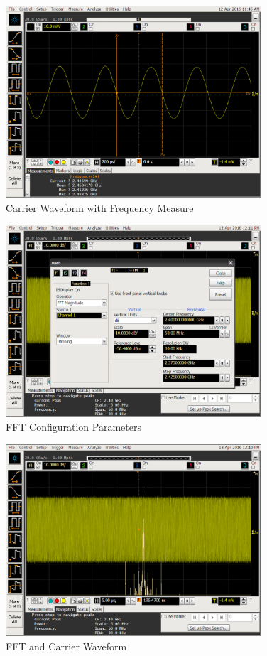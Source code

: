 \begin{figure}[htbp]
    \centering
    \includegraphics[width=0.85\textwidth]{./figures/oscill_freq}
    \caption{ Carrier Waveform with Frequency Measure
    \label{fig:oscillfreq}}
\end{figure}

\begin{figure}[htbp]
    \centering
    \includegraphics[width=0.85\textwidth]{./figures/oscill_fftcf}
    \caption{ FFT Configuration Parameters
    \label{fig:oscillfftcf}}
\end{figure}

\begin{figure}[htbp]
    \centering
    \includegraphics[width=0.85\textwidth]{./figures/oscill_fft}
    \caption{ FFT and Carrier Waveform
    \label{fig:oscillfft}}
\end{figure}


